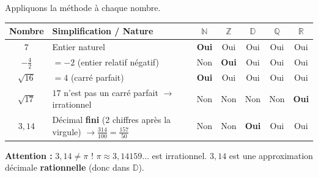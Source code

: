 \documentclass[11pt]{article}
\begin{document}
\begin{exemplebox}
Appliquons la méthode à chaque nombre.

\begin{center}
\begin{tabularx}{\linewidth}{|c|X|c|c|c|c|c|}\hline
\textbf{Nombre} & \textbf{Simplification / Nature} & $\mathbb{N}$ & $\mathbb{Z}$ & $\mathbb{D}$ & $\mathbb{Q}$ & $\mathbb{R}$ \\ \hline
$7$ & Entier naturel & \textbf{Oui} & Oui & Oui & Oui & Oui \\ \hline
$-\frac{4}{2}$ & $= -2$ (entier relatif négatif) & Non & \textbf{Oui} & Oui & Oui & Oui \\ \hline
$\sqrt{16}$ & $= 4$ (carré parfait) & \textbf{Oui} & Oui & Oui & Oui & Oui \\ \hline
$\sqrt{17}$ & $17$ n'est pas un carré parfait $\to$ irrationnel & Non & Non & Non & Non & \textbf{Oui} \\ \hline
$3,14$ & Décimal \textbf{fini} (2 chiffres après la virgule) $\to \frac{314}{100}=\frac{157}{50}$ & Non & Non & \textbf{Oui} & Oui & Oui \\ \hline
\end{tabularx}
\end{center}

\textbf{Attention :} $3,14 \neq \pi$ ! $\pi \approx 3,14159\dots$ est irrationnel. $3,14$ est une approximation décimale \textbf{rationnelle} (donc dans $\mathbb{D}$).
\end{exemplebox}
\end{document}

